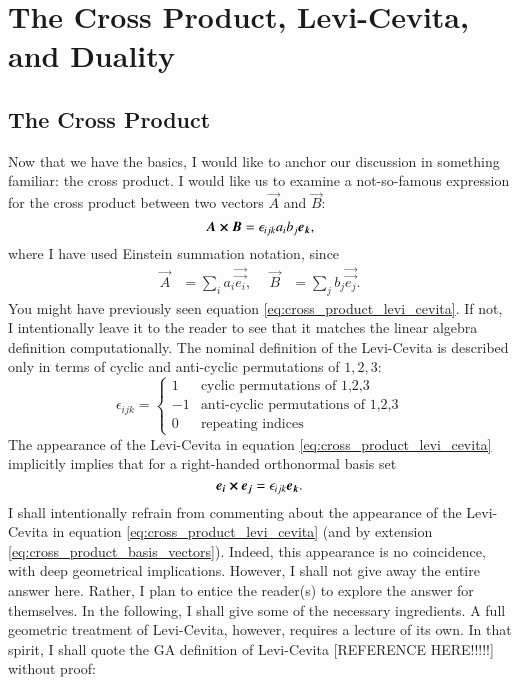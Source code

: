 
\section{The Cross Product, Levi-Cevita, and Duality}
\subsection{The Cross Product}

Now that we have the basics, I would like to anchor our discussion in something familiar: the cross product. I would like us to examine a not-so-famous expression for the cross product between two vectors $ \vec{A} $ and $\vec{B} $:
\begin{equation} \label{eq:cross_product_levi_cevita}
    \boldsymbol{A} \cross \boldsymbol{B} = \epsilon_{ijk} a_i b_j \boldsymbol{e_k},
\end{equation}
where I have used Einstein summation notation, since 
\begin{align*}
    \vec{A} &= \sum_i a_i \vec{ \vec{e_i} }, \ &\ \vec{B} &= \sum_j b_j\vec{ \vec{e_j} }.
\end{align*}
You might have previously seen equation \ref{eq:cross_product_levi_cevita}. If not, I intentionally leave it to the reader to see that it matches the linear algebra definition computationally. The nominal definition of the Levi-Cevita is described only in terms of cyclic and anti-cyclic permutations of $1, 2, 3$:
\begin{equation}
    \label{eq:levicivita_nominal_def}
    \epsilon_{ijk} = 
    \begin{cases} 
          1 & \text{cyclic permutations of 1,2,3} \\
          -1 & \text{anti-cyclic permutations of 1,2,3} \\
          0 & \text{repeating indices}
       \end{cases}
\end{equation}
The appearance of the Levi-Cevita in equation \ref{eq:cross_product_levi_cevita} implicitly implies that for a right-handed orthonormal basis set
\begin{equation}
    \label{eq:cross_product_basis_vectors}
     \boldsymbol{\boldsymbol{e_i}} \cross \boldsymbol{\boldsymbol{e_j}} = \epsilon_{ijk} \boldsymbol{\boldsymbol{e_k}} .
\end{equation}
I shall intentionally refrain from commenting about the appearance of the Levi-Cevita in equation \ref{eq:cross_product_levi_cevita} (and by extension \ref{eq:cross_product_basis_vectors}). Indeed, this appearance is no coincidence, with deep geometrical implications. However, I shall not give away the entire answer here. Rather, I plan to entice the reader(s) to explore the answer for themselves. In the following, I shall give some of the necessary ingredients. A full geometric treatment of Levi-Cevita, however, requires a lecture of its own. In that spirit, I shall quote the GA definition of Levi-Cevita [REFERENCE HERE!!!!!] without proof:
